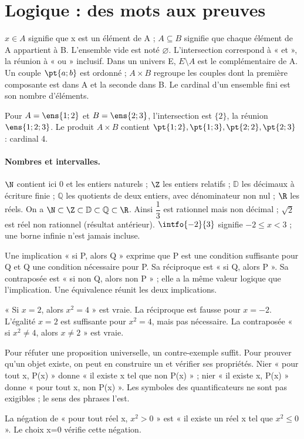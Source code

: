 \label{TRANS}
\section{Logique : des mots aux preuves}\label{LOGIQUE}
\begin{keypoint}
$x\in A$ signifie que x est un élément de A ; $A\subseteq B$ signifie que chaque élément de A appartient à B. L’ensemble vide est noté $\varnothing$. L’intersection correspond à « et », la réunion à « ou » inclusif. Dans un univers E, $E\setminus A$ est le complémentaire de A. Un couple $\pt{a;b}$ est ordonné ; $A\times B$ regroupe les couples dont la première composante est dans A et la seconde dans B. Le cardinal d’un ensemble fini est son nombre d’éléments.
\end{keypoint}
\begin{example}Pour $A=\ens{1;2}$ et $B=\ens{2;3}$, l’intersection est $\{2\}$, la réunion $\ens{1;2;3}$. Le produit $A\times B$ contient $\pt{1;2},\pt{1;3},\pt{2;2},\pt{2;3}$ : cardinal 4.\end{example}

\paragraph{Nombres et intervalles.} $\N$ contient ici 0 et les entiers naturels ; $\Z$ les entiers relatifs ; $\mathbb D$ les décimaux à écriture finie ; $\mathbb Q$ les quotients de deux entiers, avec dénominateur non nul ; $\R$ les réels. On a $\N\subset\Z\subset\mathbb D\subset\mathbb Q\subset\R$. Ainsi $\dfrac{1}{3}$ est rationnel mais non décimal ; $\sqrt2$ est réel non rationnel (résultat antérieur). $\intfo{-2}{3}$ signifie $-2\leq x<3$ ; une borne infinie n’est jamais incluse.

Une implication « si P, alors Q » exprime que P est une condition suffisante pour Q et Q une condition nécessaire pour P. Sa réciproque est « si Q, alors P ». Sa contraposée est « si non Q, alors non P » ; elle a la même valeur logique que l’implication. Une équivalence réunit les deux implications.
\begin{example}« Si $x=2$, alors $x^2=4$ » est vraie. La réciproque est fausse pour $x=-2$. L’égalité $x=2$ est suffisante pour $x^2=4$, mais pas nécessaire. La contraposée « si $x^2\ne4$, alors $x\ne2$ » est vraie.\end{example}

Pour réfuter une proposition universelle, un contre-exemple suffit. Pour prouver qu’un objet existe, on peut en construire un et vérifier ses propriétés. Nier « pour tout x, P(x) » donne « il existe x tel que non P(x) » ; nier « il existe x, P(x) » donne « pour tout x, non P(x) ». Les symboles des quantificateurs ne sont pas exigibles ; le sens des phrases l’est.
\begin{example}La négation de « pour tout réel x, $x^2>0$ » est « il existe un réel x tel que $x^2\leq0$ ». Le choix x=0 vérifie cette négation.\end{example}

